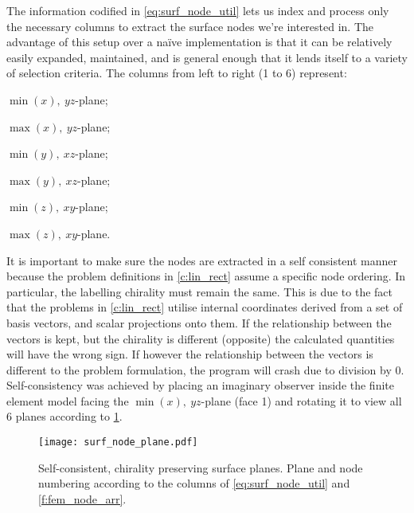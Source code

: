 The information codified in \cref{eq:surf_node_util} lets us index and process only the necessary columns to extract the surface nodes we're interested in. The advantage of this setup over a naïve implementation is that it can be relatively easily expanded, maintained, and is general enough that it lends itself to a variety of selection criteria. The columns from left to right (1 to 6) represent:
\begin{inparaenum}
	\item $ \min(x),~ yz $-plane;
	\item $ \max(x),~ yz $-plane;
	\item $ \min(y),~ xz $-plane;
	\item $ \max(y),~ xz $-plane;
	\item $ \min(z),~ xy $-plane;
	\item $ \max(z),~ xy $-plane.
\end{inparaenum}

It is important to make sure the nodes are extracted in a self consistent manner because the problem definitions in \cref{c:lin_rect} assume a specific node ordering. In particular, the labelling chirality must remain the same. This is due to the fact that the problems in \cref{c:lin_rect} utilise internal coordinates derived from a set of basis vectors, and scalar projections onto them. If the relationship between the vectors is kept, but the chirality is different (opposite) the calculated quantities will have the wrong sign. If however the relationship between the vectors is different to the problem formulation, the program will crash due to division by 0. Self-consistency was achieved by placing an imaginary observer inside the finite element model facing the $ \min(x),~ yz $-plane (face 1) and rotating it to view all 6 planes according to \cref{f:surf_node_plane}.
\begin{figure}
	\centering
	\texttt{[image: surf\_node\_plane.pdf]}
	\caption[Self-consistent, chirality preserving surface planes.]{Self-consistent, chirality preserving surface planes. Plane and node numbering according to the columns of \cref{eq:surf_node_util} and \cref{f:fem_node_arr}.}
	\label{f:surf_node_plane}
\end{figure}
